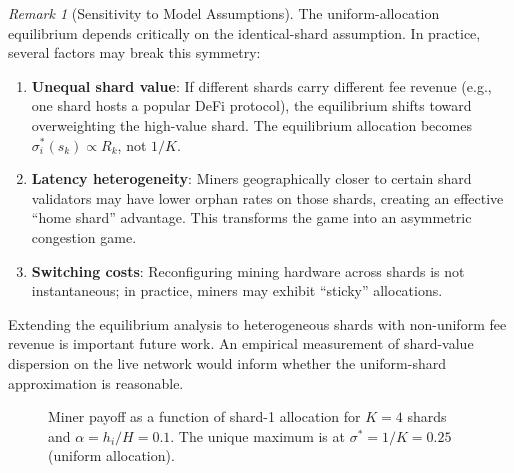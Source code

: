 \documentclass[11pt,a4paper]{article}
\theoremstyle{definition}
\theoremstyle{remark}
\newtheorem{remark}[theorem]{Remark}
\newcommand{\strategy}{\sigma}
\newcommand{\hashrate}{h}
\newcommand{\Hashrate}{H}
\newcommand{\reward}{R}
\begin{document}
\begin{remark}[Sensitivity to Model Assumptions]\label{rem:nash-limitations}
The uniform-allocation equilibrium depends critically on the identical-shard
assumption.
In practice, several factors may break this symmetry:
\begin{enumerate}[label=(\roman*),nosep]
  \item \textbf{Unequal shard value}: If different shards carry different
    fee revenue (e.g., one shard hosts a popular DeFi protocol), the
    equilibrium shifts toward overweighting the high-value shard.
    The equilibrium allocation becomes
    $\strategy_i^*(s_k) \propto \reward_k$, not $1/K$.
  \item \textbf{Latency heterogeneity}: Miners geographically closer to
    certain shard validators may have lower orphan rates on those shards,
    creating an effective ``home shard'' advantage.
    This transforms the game into an asymmetric congestion game.
  \item \textbf{Switching costs}: Reconfiguring mining hardware across
    shards is not instantaneous; in practice, miners may exhibit ``sticky''
    allocations.
\end{enumerate}
Extending the equilibrium analysis to heterogeneous shards with
non-uniform fee revenue is important future work.
An empirical measurement of shard-value dispersion on the live network
would inform whether the uniform-shard approximation is reasonable.
\end{remark}

\begin{figure}[t]
\centering
{}
\caption{Miner payoff as a function of shard-1 allocation for $K=4$ shards
and $\alpha = \hashrate_i / \Hashrate = 0.1$.
The unique maximum is at $\sigma^* = 1/K = 0.25$ (uniform allocation).}
\label{fig:shard-payoff}
\end{figure}
\end{document}
